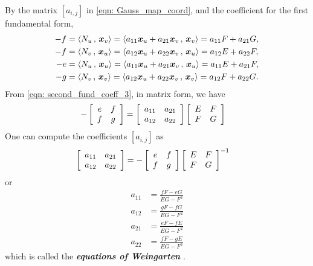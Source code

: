 \documentclass[11pt]{article}
\begin{document}
\begin{itemize}
By the matrix $[a_{i,j}]$ in \eqref{eqn: Gauss_map_coord}, and the coefficient for the first fundamental form, 
\begin{align}
-f &=  \left\langle N_{u}\,,\, \boldsymbol{x}_{v} \right\rangle = \left\langle a_{11}\boldsymbol{x}_{u} + a_{21}\boldsymbol{x}_{v}\,,\, \boldsymbol{x}_{v} \right\rangle = a_{11}F + a_{21}G, \nonumber\\
-f &=  \left\langle N_{v}\,,\, \boldsymbol{x}_{u} \right\rangle = \left\langle a_{12}\boldsymbol{x}_{u} + a_{22}\boldsymbol{x}_{v}\,,\, \boldsymbol{x}_{u} \right\rangle = a_{12}E + a_{22}F, \nonumber\\
-e &= \left\langle N_{u}\,,\, \boldsymbol{x}_{u} \right\rangle  = \left\langle a_{11}\boldsymbol{x}_{u} + a_{21}\boldsymbol{x}_{v}\,,\, \boldsymbol{x}_{u} \right\rangle = a_{11}E + a_{21}F, \nonumber\\
-g &= \left\langle N_{v}\,,\, \boldsymbol{x}_{v} \right\rangle  = \left\langle a_{12}\boldsymbol{x}_{u} + a_{22}\boldsymbol{x}_{v}\,,\, \boldsymbol{x}_{v} \right\rangle = a_{12}F + a_{22}G. \label{eqn: second_fund_coeff_3} 
\end{align}
From \eqref{eqn: second_fund_coeff_3}, in matrix form, we have
\begin{align}
-\left[\begin{array}{cc}
e & f \\ 
f & g
\end{array} \right]
&= 
\left[\begin{array}{cc}
a_{11} & a_{21} \\ 
a_{12} & a_{22}
\end{array} \right]
\left[\begin{array}{cc}
E & F \\ 
F & G
\end{array} \right]
\end{align}
One can compute the coefficients $[a_{i,j}]$ as
\begin{align*}
\left[\begin{array}{cc}
a_{11} & a_{21} \\ 
a_{12} & a_{22}
\end{array} \right]
&= -\left[\begin{array}{cc}
e & f \\ 
f & g
\end{array} \right]
\left[\begin{array}{cc}
E & F \\ 
F & G
\end{array} \right]^{-1}
\end{align*} or
\begin{align}
a_{11} &= \frac{fF- eG}{EG- F^{2}} \nonumber\\
a_{12} &= \frac{gF- fG}{EG- F^{2}} \nonumber\\
a_{21} &= \frac{eF- fE}{EG- F^{2}} \nonumber\\
a_{22} &= \frac{fF- gE}{EG- F^{2}} \label{eqn: weingarten}
\end{align}
which is called the \emph{\textbf{equations of Weingarten}} \citep{do1976differential}. 


\end{itemize}
\end{document}

